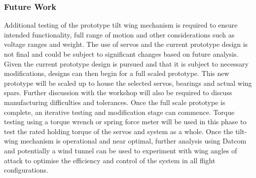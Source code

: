 \subsubsection{Future Work}
Additional testing of the prototype tilt wing mechanism is required to ensure intended functionality, full range of motion and other considerations such as voltage ranges and weight. The use of servos and the current prototype design is not final and could be subject to significant changes based on future analysis. Given the current prototype design is pursued and that it is subject to necessary modifications, designs can then begin for a full scaled prototype. This new prototype will be scaled up to house the selected servos, bearings and actual wing spars. Further discussion with the workshop will also be required to discuss manufacturing difficulties and tolerances. Once the full scale prototype is complete, an iterative testing and modification stage can commence. Torque testing using a torque wrench or spring force meter will be used in this phase to test the rated holding torque of the servos and system as a whole. Once the tilt-wing mechanism is operational and near optimal, further analysis using Datcom and potentially a wind tunnel can be used to experiment with wing angles of attack to optimise the efficiency and control of the system in all flight configurations. 

